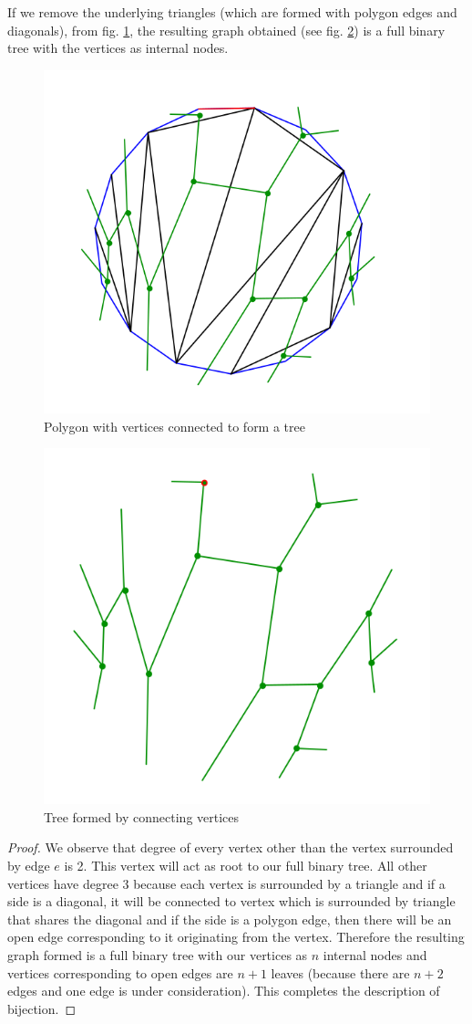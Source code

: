 \begin{claim}
	If we remove the underlying triangles (which are formed with polygon edges and diagonals), from fig. \ref{fig:tree-in-polygon}, the 		resulting graph obtained (see fig. \ref{fig:tree}) is a full binary tree with the vertices as internal nodes.
\end{claim}
\begin{figure}[h!]
    \centering
    \includegraphics[width=0.4\linewidth]{polygon-tree.png}
    \caption{Polygon with vertices connected to form a tree}
    \label{fig:tree-in-polygon}
\end{figure}
\begin{figure}[h!]
    \centering
    \includegraphics[width=0.4\linewidth]{tree.png}
    \caption{Tree formed by connecting vertices}
    \label{fig:tree}
\end{figure}
\begin{proof}
	We observe that degree of every vertex other than the vertex surrounded by edge $e$ is 2. This vertex will act as root to our full binary tree. All other vertices have degree 3 because each vertex is surrounded by a triangle and if a side is a diagonal, it will be connected to vertex which is surrounded by triangle that shares the diagonal and if the side is a polygon edge, then there will be an open edge corresponding to it originating from the vertex. Therefore the resulting graph formed is a full binary tree with our vertices as $n$ internal nodes and vertices corresponding to open edges are $n+1$ leaves (because there are $n+2$ edges and one edge is under consideration). This completes the description of bijection.
\end{proof}

